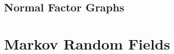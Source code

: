 \documentclass[11pt,fleqn]{book} %
\def\R{\mathbb{R}}
\begin{document}
\subsection{Normal Factor Graphs}


\section{Markov Random Fields}

\vskip 0.2in







\end{document}
